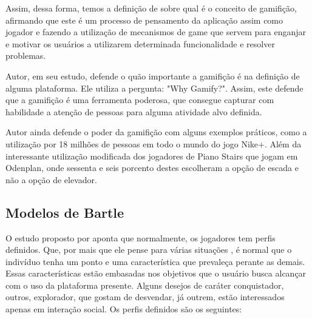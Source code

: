 Assim, dessa forma, temos a definição de \cite{zichermann2011gamification} sobre qual é o conceito de
gamifição, afirmando que este é um processo de pensamento da aplicação assim
como jogador e fazendo a utilização
de mecanismos de game que servem para enganjar e motivar os usuários a utilizarem
determinada funcionalidade e resolver problemas.

Autor, em seu estudo, defende o quão importante a gamifição é na definição
de alguma plataforma. Ele utiliza a pergunta: "Why Gamify?". Assim, este defende
que a gamifição é uma ferramenta poderosa, que consegue capturar com habilidade
a atenção de pessoas para alguma atividade alvo definida.

Autor ainda defende  o poder da gamifição com alguns exemplos práticos,
como a utilização por 18 milhões de pessoas em todo o mundo do jogo Nike+.
Além da interessante utilização modificada dos jogadores de
Piano Stairs que jogam em Odenplan, onde sessenta e seis porcento destes
escolheram a opção de escada e não a opção de elevador.

\subsection{Modelos de Bartle}
\label{sub:modeloBartle}
O estudo proposto por \cite{bartle1996hearts} aponta que normalmente, os jogadores
tem perfis definidos. Que, por mais que ele pense para várias situações
, é normal que o indivíduo tenha um ponto e uma característica que prevaleça
perante as demais. Essas características estão embasadas nos objetivos
que o usuário  busca alcançar com o uso da plataforma presente.
Alguns desejos de caráter conquistador, outros, explorador, que gostam
de desvendar, já outrem, estão interessados apenas em interação
social. Os perfis definidos são os seguintes:


